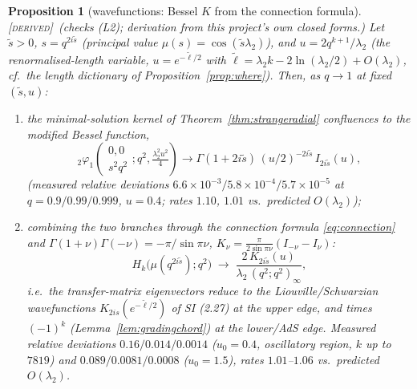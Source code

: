 \documentclass[11pt,a4paper]{article}
\newcommand{\DERIVED}{{\color{teal}\textsc{[derived]}}}
\theoremstyle{definition}
\theoremstyle{plain}
\newtheorem{proposition}[definition]{Proposition}
\begin{document}
\begin{proposition}[wavefunctions: Bessel $K$ from the connection formula]\label{prop:besselK}
\DERIVED\ (checks (L2); derivation from this project's own closed forms.) Let
$\tilde s>0$, $s=q^{2i\tilde s}$ (principal value $\mu(s)=\cos(\tilde s\lambda_2)$), and
$u=2q^{k+1}/\lambda_2$ (the renormalised-length variable, $u=e^{-\tilde\ell/2}$ with
$\tilde\ell=\lambda_2 k-2\ln(\lambda_2/2)+O(\lambda_2)$, cf.\ the length dictionary of
Proposition~\ref{prop:where}). Then, as $q\to1$ at fixed $(\tilde s,u)$:
\begin{enumerate}[label=(\alph*)]
\item the minimal-solution kernel of Theorem~\ref{thm:strangeradial} confluences to the
modified Bessel function,
\begin{equation}\label{eq:Iconfluence}
  {}_{2}\varphi_{1}\!\left(\begin{matrix}0,0\\ s^{2}q^{2}\end{matrix};q^{2},
  \tfrac{\lambda_2^{2}u^{2}}{4}\right)\longrightarrow
  \Gamma(1+2i\tilde s)\,(u/2)^{-2i\tilde s}\,I_{2i\tilde s}(u),
\end{equation}
(measured relative deviations $6.6\times10^{-3}/5.8\times10^{-4}/5.7\times10^{-5}$ at
$q=0.9/0.99/0.999$, $u=0.4$; rates $1.10$, $1.01$ vs.\ predicted $O(\lambda_2)$);
\item combining the two branches through the connection formula \eqref{eq:connection} and
$\Gamma(1+\nu)\Gamma(-\nu)=-\pi/\sin\pi\nu$,
$K_{\nu}=\tfrac{\pi}{2\sin\pi\nu}(I_{-\nu}-I_{\nu})$:
\begin{equation}\label{eq:HtoK}
  H_{k}\bigl(\mu(q^{2i\tilde s});q^{2}\bigr)\;\longrightarrow\;
  \frac{2\,K_{2i\tilde s}(u)}{\lambda_2\,(q^{2};q^{2})_{\infty}},
\end{equation}
i.e.\ the transfer-matrix eigenvectors reduce to the Liouville/Schwarzian wavefunctions
$K_{2is}(e^{-\tilde\ell/2})$ of SI (2.27) at the upper edge, and times $(-1)^{k}$
(Lemma~\ref{lem:gradingchord}) at the lower/AdS edge. Measured relative deviations
$0.16/0.014/0.0014$ ($u_{0}=0.4$, oscillatory region, $k$ up to $7819$) and
$0.089/0.0081/0.0008$ ($u_{0}=1.5$), rates $1.01$--$1.06$ vs.\ predicted $O(\lambda_2)$.
\end{enumerate}
\end{proposition}
\end{document}

